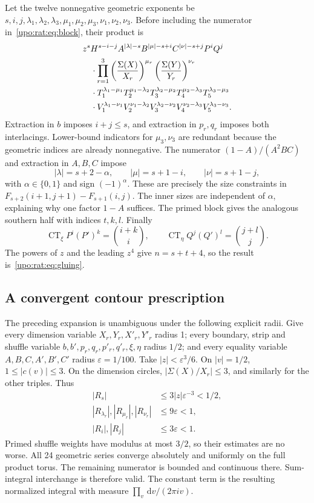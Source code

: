 \documentclass[11pt,letterpaper]{article}
\theoremstyle{remark}\newtheorem{remark}[theorem]{Remark}
\numberwithin{equation}{section}
\newcommand{\CT}{\operatorname{CT}}
\newcommand{\dd}{\,\mathrm d}
\begin{document}
Let the twelve nonnegative geometric exponents be
$s,i,j,\lambda_1,\lambda_2,\lambda_3,\mu_1,\mu_2,\mu_3,
\nu_1,\nu_2,\nu_3$. Before including the numerator in~\eqref{upo:rat:eq:block},
their product is
\begin{align}\label{upo:rat:eq:expandedweights}
&z^sH^{s-i-j}A^{|\lambda|-s}B^{|\mu|-s+i}C^{|\nu|-s+j}P^iQ^j
\notag\\
&\quad\cdot\prod_{r=1}^3
\left(\frac{\Sigma(X)}{X_r}\right)^{\mu_r}
\left(\frac{\Sigma(Y)}{Y_r}\right)^{\nu_r}\notag\\
&\quad\cdot T_1^{\lambda_1-\mu_1}T_2^{\mu_1-\lambda_2}
T_3^{\lambda_2-\mu_2}T_4^{\mu_2-\lambda_3}T_5^{\lambda_3-\mu_3}
\notag\\
&\quad\cdot V_1^{\lambda_1-\nu_1}V_2^{\nu_1-\lambda_2}
V_3^{\lambda_2-\nu_2}V_4^{\nu_2-\lambda_3}V_5^{\lambda_3-\nu_3}.
\end{align}
Extraction in $b$ imposes $i+j\le s$, and extraction in $p_r,q_r$ imposes
both interlacings. Lower-bound indicators for $\mu_3,\nu_3$ are redundant
because the geometric indices are already nonnegative.
The numerator $(1-A)/(A^2BC)$ and extraction in $A,B,C$ impose
\begin{equation}\label{upo:rat:eq:CTsizes}
|\lambda|=s+2-\alpha,\qquad |\mu|=s+1-i,\qquad |\nu|=s+1-j,
\end{equation}
with $\alpha\in\{0,1\}$ and sign $(-1)^\alpha$.
These are precisely the size constraints in
$F_{s+2}(i+1,j+1)-F_{s+1}(i,j)$. The inner sizes are independent of
$\alpha$, explaining why one factor $1-A$ suffices. The primed block
gives the analogous southern half with indices $t,k,l$.
Finally
\[
\CT_\xi P^i(P')^k=\binom{i+k}{i},\qquad
\CT_\eta Q^j(Q')^l=\binom{j+l}{j}.
\]
The powers of $z$ and the leading $z^4$ give $n=s+t+4$, so the result
is~\eqref{upo:rat:eq:gluing}.

\subsection{A convergent contour prescription}
The preceding expansion is unambiguous under the following explicit
radii. Give every dimension variable $X_r,Y_r,X'_r,Y'_r$ radius 1;
every boundary, strip and shuffle variable
$b,b',p_r,q_r,p'_r,q'_r,\xi,\eta$ radius $1/2$; and every equality variable
$A,B,C,A',B',C'$ radius $\varepsilon=1/100$.
Take $|z|<\varepsilon^3/6$.
On $|v|=1/2$, $1\le|c(v)|\le3$. On the dimension circles,
$|\Sigma(X)/X_r|\le3$, and similarly for the other triples. Thus
\begin{align*}
|R_s|&\le3|z|\varepsilon^{-3}<1/2,\\
|R_{\lambda_r}|,|R_{\mu_r}|,|R_{\nu_r}|&\le9\varepsilon<1,\\
|R_i|,|R_j|&\le3\varepsilon<1.
\end{align*}
Primed shuffle weights have modulus at most $3/2$, so their estimates
are no worse. All 24 geometric series converge absolutely and uniformly
on the full product torus. The remaining numerator is bounded and
continuous there. Sum-integral interchange is therefore valid.
The constant term is the resulting normalized integral with measure
$\prod_v\dd v/(2\pi i v)$.
\end{document}
